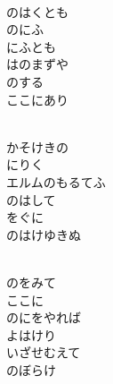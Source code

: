 \documentclass[10pt,b5j]{tarticle} %
\begin{document}
\begin{enumerate}
\begin{minipage}[c]{\blocksize}
        \vspace{\linespace}
        \item~\\
        のはくとも\\
        のにふ\\
        にふとも\\
        はのまずや\\
        のする\\
        ここにあり
        
        \vspace{\linespace}
        \item~\\
        かそけきの\\
        にりく\\
        エルムのもるてふ\\
        のはして\\
        をぐに\\
        のはけゆきぬ
        
        \vspace{\linespace}
        \item~\\
        のをみて\\
        ここに\\
        のにをやれば\\
        よはけり\\
        いざせむえて\\
        のぼらけ
    
    \end{minipage}
\end{enumerate} %
\end{document}
